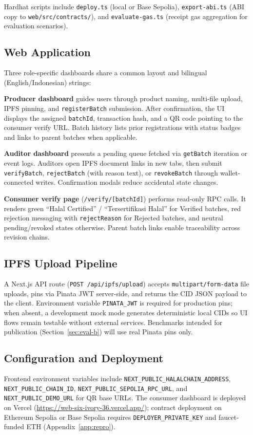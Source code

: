 Hardhat scripts include \texttt{deploy.ts} (local or Base Sepolia), \texttt{export-abi.ts} (ABI copy to \texttt{web/src/contracts/}), and \texttt{evaluate-gas.ts} (receipt gas aggregation for evaluation scenarios).

\subsection{Web Application}
Three role-specific dashboards share a common layout and bilingual (English/Indonesian) strings:

\textbf{Producer dashboard} guides users through product naming, multi-file upload, IPFS pinning, and \texttt{registerBatch} submission.
After confirmation, the UI displays the assigned \texttt{batchId}, transaction hash, and a QR code pointing to the consumer verify URL.
Batch history lists prior registrations with status badges and links to parent batches when applicable.

\textbf{Auditor dashboard} presents a pending queue fetched via \texttt{getBatch} iteration or event logs.
Auditors open IPFS document links in new tabs, then submit \texttt{verifyBatch}, \texttt{rejectBatch} (with reason text), or \texttt{revokeBatch} through wallet-connected writes.
Confirmation modals reduce accidental state changes.

\textbf{Consumer verify page} (\texttt{/verify/[batchId]}) performs read-only RPC calls.
It renders green ``Halal Certified'' / ``Tersertifikasi Halal'' for Verified batches, red rejection messaging with \texttt{rejectReason} for Rejected batches, and neutral pending/revoked states otherwise.
Parent batch links enable traceability across revision chains.

\subsection{IPFS Upload Pipeline}
A Next.js API route (\texttt{POST /api/ipfs/upload}) accepts \texttt{multipart/form-data} file uploads, pins via Pinata JWT server-side, and returns the CID JSON payload to the client.
Environment variable \texttt{PINATA\_JWT} is required for production pins; when absent, a development mock mode generates deterministic local CIDs so UI flows remain testable without external services.
Benchmarks intended for publication (Section~\ref{sec:eval-b}) will use real Pinata pins only.

\subsection{Configuration and Deployment}
Frontend environment variables include \texttt{NEXT\_PUBLIC\_HALALCHAIN\_ADDRESS}, \texttt{NEXT\_PUBLIC\_CHAIN\_ID}, \texttt{NEXT\_PUBLIC\_SEPOLIA\_RPC\_URL}, and \texttt{NEXT\_PUBLIC\_DEMO\_URL} for QR base URLs.
The consumer dashboard is deployed on Vercel (\url{https://web-six-ivory-36.vercel.app/}); contract deployment on Ethereum Sepolia or Base Sepolia requires \texttt{DEPLOYER\_PRIVATE\_KEY} and faucet-funded ETH (Appendix~\ref{app:repro}).
